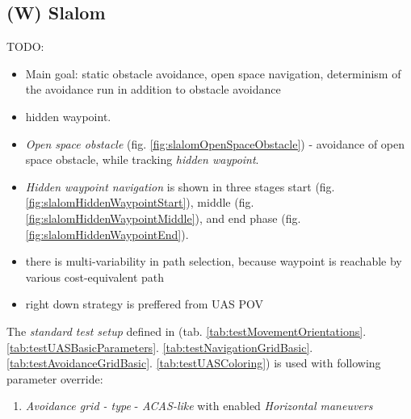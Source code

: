 \subsection{(W) Slalom}\label{s:testSlalom}
    \noindent TODO:
        \begin{itemize}
            \item Main goal: static obstacle avoidance, open space navigation, determinism of the avoidance run in addition to obstacle avoidance
            
            \item hidden waypoint.
            \item \emph{Open space obstacle} (fig. \ref{fig:slalomOpenSpaceObstacle}) - avoidance of open space obstacle, while tracking \emph{hidden waypoint}.
            
            \item \emph{Hidden waypoint navigation} is shown in three stages start (fig. \ref{fig:slalomHiddenWaypointStart}), middle (fig. \ref{fig:slalomHiddenWaypointMiddle}), and end phase (fig. \ref{fig:slalomHiddenWaypointEnd}).
            
            \item there is multi-variability in path selection, because waypoint is reachable by various cost-equivalent path
            
            \item right down strategy is preffered from UAS POV
        \end{itemize}
    
    
    The \emph{standard test setup} defined in (tab.  \ref{tab:testMovementOrientations}. \ref{tab:testUASBasicParameters}. \ref{tab:testNavigationGridBasic}. \ref{tab:testAvoidanceGridBasic}. \ref{tab:testUASColoring}) is used with following parameter override:
    \begin{enumerate}
        \item \emph{Avoidance grid - type} - \emph{ACAS-like} with enabled \emph{Horizontal maneuvers}
    \end{enumerate}

